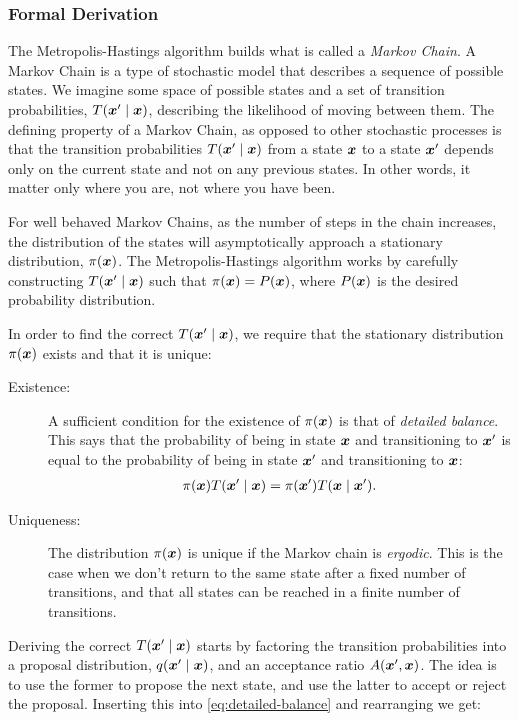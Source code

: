 \documentclass[Thesis.tex]{subfiles}
\begin{document}
\subsubsection{Formal Derivation}

The Metropolis-Hastings algorithm builds what is called a \emph{Markov Chain}. A
Markov Chain is a type of stochastic model that describes a sequence of possible
states. We imagine some space of possible states and a set of transition
probabilities, $T\qty(\bm{x}'\;\middle|\;\bm{x})$, describing the likelihood of moving between them.
The defining property of a Markov Chain, as opposed to other stochastic
processes is that the transition probabilities $T\qty(\bm{x}'\;\middle|\;\bm{x})$ from a state $\bm{x}$
to a state $\bm{x}'$ depends only on the current state and not on any previous
states. In other words, it matter only where you are, not where you have been.

For well behaved Markov Chains, as the number of steps in the chain increases,
the distribution of the states will asymptotically approach a stationary
distribution, $\pi(\bm{x})$. The Metropolis-Hastings algorithm works by carefully
constructing $T\qty(\bm{x}'\;\middle|\;\bm{x})$ such that $\pi(\bm{x})=P(\bm{x})$, where $P(\bm{x})$ is the
desired probability distribution.

In order to find the correct $T\qty(\bm{x}'\;\middle|\;\bm{x})$, we require that the stationary
distribution $\pi(\bm{x})$ exists and that it is unique:

\begin{description}
\item[Existence:] A sufficient condition for the existence of $\pi(\bm{x})$ is that
  of \emph{detailed balance}. This says that the probability of being in state
  $\bm{x}$ and transitioning to $\bm{x}'$ is equal to the probability of being in state
  $\bm{x}'$ and transitioning to $\bm{x}$:
  \begin{align}
    \label{eq:detailed-balance}
    \pi\qty(\bm{x})T\qty(\bm{x}'\;\middle|\;\bm{x}) = \pi\qty(\bm{x}')T\qty(\bm{x}\;\middle|\;\bm{x}').
  \end{align}
\item[Uniqueness:] The distribution $\pi(\bm{x})$ is unique if the Markov chain is
  \emph{ergodic}. This is the case when we don't return to the same state after
  a fixed number of transitions, and that all states can be reached in a finite
  number of transitions.
\end{description}
Deriving the correct $T\qty(\bm{x}'\;\middle|\;\bm{x})$ starts by factoring the transition
probabilities into a proposal distribution, $q\qty(\bm{x}'\;\middle|\;\bm{x})$, and an
acceptance ratio $A\qty(\bm{x}',\bm{x})$. The idea is to use the former to propose the
next state, and use the latter to accept or reject the proposal. Inserting this
into \cref{eq:detailed-balance} and rearranging we get:
\end{document}
